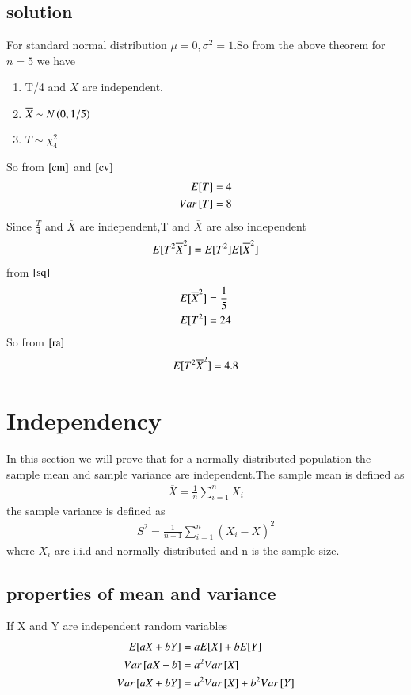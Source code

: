 \documentclass[journal,12pt,twocolumn]{IEEEtran}
\begin{document}
\subsection{solution}
For standard normal distribution $\mu=0,\sigma^2=1$.So from the above theorem for $n=5$ we have
\begin{enumerate}
    \item T/4 and $\overline{X}$ are independent.
    \item $\overline{X} \sim N\left(0,1/5\right)$
    \item $T \sim \chi_4^2$
\end{enumerate}
So from $\eqref{cm}$ and $\eqref{cv}$
\begin{align}
    E[ T ]=4\\
    Var{}\left[T\right]=8
\end{align}
Since $\frac{T}{4}$ and $\overline{X}$ are independent,T and $\overline{X}$ are also independent
\begin{align}
    E[ T^2\overline{X}^2 ]=E[ T^2 ]E[ \overline{X}^2 ]\label{ra}
\end{align}
from $\eqref{sq}$ 
\begin{align}
    E[ \overline{X}^2 ]&=\frac{1}{5}\\
    E[ T^2 ]&=24
\end{align}
So from $\eqref{ra}$
\begin{align}
    E[ T^2\overline{X}^2 ]=4.8
\end{align}
\section{Independency}
In this section we will prove that for a normally distributed population the sample mean and sample variance are independent.The sample mean is defined as
\begin{align}
    \overline{X}=\frac{1}{n}\sum_{i=1}^{n}X_i
\end{align}
the sample variance is defined as
\begin{align}
    S^2=\frac{1}{n-1}\sum_{i=1}^{n}(X_i-\overline{X})^2
\end{align}
where $X_i$ are i.i.d and normally distributed and n is the sample size.
\subsection{properties of mean and variance}
If X and Y are independent random variables
\begin{align}
    E[ aX+bY ]&=aE[ X ]+bE[ Y ]\\
    Var{}\left[aX+b\right]&=a^2Var{}\left[X\right]\\
    Var{}\left[aX+bY\right]&=a^2Var{}\left[X\right]+b^2Var{}\left[Y\right]
\end{align}
\end{document}
